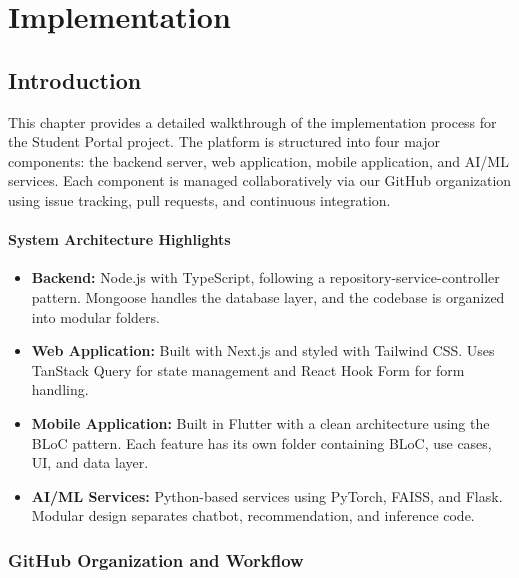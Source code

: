 \lstset{style=mystyle}

\chapter{Implementation}
\label{chap:coding}

\section{Introduction}
\label{sec:introduction}

This chapter provides a detailed walkthrough of the implementation process for the Student Portal project. The platform is structured into four major components: the backend server, web application, mobile application, and AI/ML services. Each component is managed collaboratively via our GitHub organization using issue tracking, pull requests, and continuous integration.

\subsubsection{System Architecture Highlights}

\begin{itemize}
    \item \textbf{Backend:} Node.js with TypeScript, following a repository-service-controller pattern. Mongoose handles the database layer, and the codebase is organized into modular folders.
    
    \item \textbf{Web Application:} Built with Next.js and styled with Tailwind CSS. Uses TanStack Query for state management and React Hook Form for form handling.
    
    \item \textbf{Mobile Application:} Built in Flutter with a clean architecture using the BLoC pattern. Each feature has its own folder containing BLoC, use cases, UI, and data layer.
    
    \item \textbf{AI/ML Services:} Python-based services using PyTorch, FAISS, and Flask. Modular design separates chatbot, recommendation, and inference code.
\end{itemize}

\subsection{GitHub Organization and Workflow}
\label{subsec:github_workflow}

